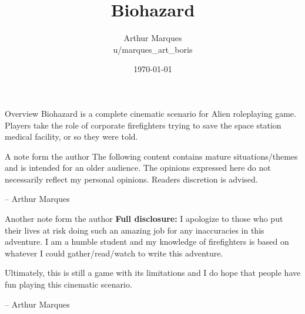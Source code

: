 \documentclass[10pt,twoside,twocolumn]{book}
\title{Biohazard}
\date{\today}
\author{Arthur Marques \\ u/marques\_art\_boris}
\begin{document}
\selectfont %
\frontmatter

\maketitle


\begin{rpg-commentbox}{Overview}
  Biohazard is a complete cinematic scenario for Alien roleplaying game. Players take the role of corporate firefighters trying to save the space station medical facility, or so they were told.
\end{rpg-commentbox}



\begin{rpg-warnbox}{A note form the author}
  The following content contains mature situations/themes and is intended for an older audience. The opinions expressed here do not necessarily reflect my personal opinions. Readers discretion is advised.

  \begin{flushright}
  -- Arthur Marques
  \end{flushright}
\end{rpg-warnbox}


\medskip
\begin{rpg-warnbox}{Another note form the author}
  \textbf{Full disclosure:} I apologize to those who put their lives at risk doing such an amazing job for any inaccuracies in this adventure. I am a humble student and my knowledge of firefighters is based on whatever I could gather/read/watch to write this adventure. 
  
  Ultimately, this is still a game with its limitations and I do hope that people have fun playing this cinematic scenario.
  \begin{flushright}
  -- Arthur Marques
  \end{flushright}
\end{rpg-warnbox}


\tableofcontents

\mainmatter

\end{document}
